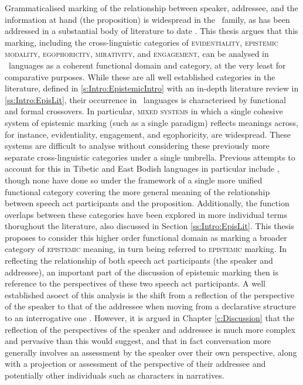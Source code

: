 Grammaticalised marking of the relationship between speaker, addressee, and the information at hand (the proposition) is widespread in the \lfam\ family, as has been addressed in a substantial body of literature to date \cites{Aikhenvald2004}{Hill2017}. This thesis argues that this marking, including the cross-linguistic categories of \textsc{evidentiality}, \textsc{epistemic modality}, \textsc{egophoricity}, \textsc{mirativity}, and \textsc{engagement}, can be analysed in \lfam\ languages as a coherent functional domain and category, at the very least for comparative purposes. While these are all well established categories in the literature, defined in \ref{s:Intro:EpistemicIntro} with an in-depth literature review in \ref{ss:Intro:EpisLit}, their occurrence in \lfam\ languages is characterised by functional and formal crossovers. In particular, \textsc{mixed systems} in which a single cohesive system of epistemic marking (such as a single paradigm) reflects meanings across, for instance, evidentiality, engagement, and egophoricity, are widespread. These systems are difficult to analyse without considering these previously more separate cross-linguistic categories under a single umbrella. Previous attempts to account for this in Tibetic and East Bodish languages in particular include , though none have done so under the framework of a single more unified functional category covering the more general meaning of the relationship between speech act participants and the proposition. Additionally, the function overlaps between these categories have been explored in more individual terms thorughout the literature, also discussed in Section \ref{ss:Intro:EpisLit}. This thesis proposes to consider this higher order functional domain as marking a broader category of \textsc{epistemic} meaning, in turn being referred to \textsc{epistemic} marking. In reflecting the relationship of both speech act participants (the speaker and addressee), an important part of the discussion of epistemic marking then is reference to the perspectives of these two speech act participants. A well established asoect of this analysis is the shift from a reflection of the perspective of the speaker to that of the addressee when moving from a declarative structure to an interrogative one \cite{Hill2020}. However, it is argued in Chapter \ref{c:Discussion} that the reflection of the perspectives of the speaker and addressee is much more complex and pervasive than this would suggest, and that in fact conversation more generally involves an assessment by the speaker over their own perspective, along with a projection or assessment of the perspective of their addressee and potentially other individuals such as characters in narratives. 

